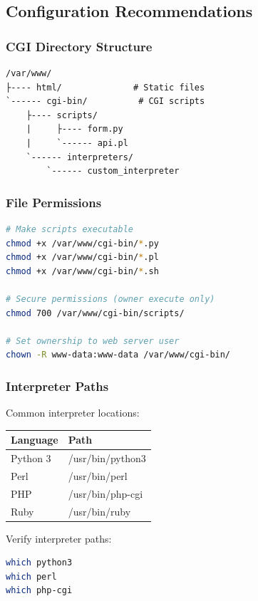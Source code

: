\documentclass[11pt,a4paper]{article}
\begin{document}
\subsection{Configuration Recommendations}

\subsubsection{CGI Directory Structure}

\begin{verbatim}
/var/www/
├---- html/              # Static files
`------ cgi-bin/          # CGI scripts
    ├---- scripts/
    |     ├---- form.py
    |     `------ api.pl
    `------ interpreters/
        `------ custom_interpreter
\end{verbatim}

\subsubsection{File Permissions}

\begin{lstlisting}[language=bash, caption=Permission Setup]
# Make scripts executable
chmod +x /var/www/cgi-bin/*.py
chmod +x /var/www/cgi-bin/*.pl
chmod +x /var/www/cgi-bin/*.sh

# Secure permissions (owner execute only)
chmod 700 /var/www/cgi-bin/scripts/

# Set ownership to web server user
chown -R www-data:www-data /var/www/cgi-bin/
\end{lstlisting}

\subsubsection{Interpreter Paths}

Common interpreter locations:

\begin{tabular}{|l|l|}
\hline
\textbf{Language} & \textbf{Path} \\
\hline
Python 3 & /usr/bin/python3 \\
Perl & /usr/bin/perl \\
PHP & /usr/bin/php-cgi \\
Ruby & /usr/bin/ruby \\
\hline
\end{tabular}

Verify interpreter paths:
\begin{lstlisting}[language=bash]
which python3
which perl
which php-cgi
\end{lstlisting}
\end{document}
